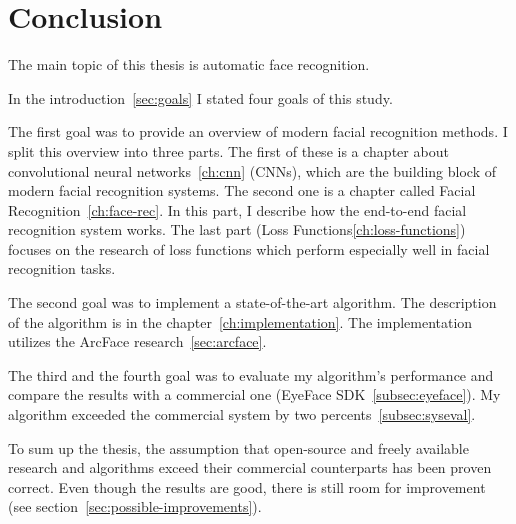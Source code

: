 \chapter{Conclusion}\label{ch:conclusion}
The main topic of this thesis is automatic face recognition.

In the introduction~\ref{sec:goals} I stated four goals of this study.

The first goal was to provide an overview of modern facial recognition methods.
I split this overview into three parts.
The first of these is a chapter about convolutional neural networks~\ref{ch:cnn} (CNNs), which are the building
block of modern facial recognition systems.
The second one is a chapter called Facial Recognition~\ref{ch:face-rec}.
In this part, I describe how the end-to-end facial recognition system works.
The last part (Loss Functions\ref{ch:loss-functions}) focuses on the research of loss functions which perform
especially well in facial recognition tasks.

The second goal was to implement a state-of-the-art algorithm.
The description of the algorithm is in the chapter~\ref{ch:implementation}.
The implementation utilizes the ArcFace research~\ref{sec:arcface}.

The third and the fourth goal was to evaluate my algorithm's performance and compare the results with a commercial one
(EyeFace SDK~\ref{subsec:eyeface}).
My algorithm exceeded the commercial system by two percents~\ref{subsec:syseval}.

To sum up the thesis, the assumption that open-source and freely available research and algorithms exceed
their commercial counterparts has been proven correct.
Even though the results are good, there is still room for improvement (see section~\ref{sec:possible-improvements}).
\newpage

